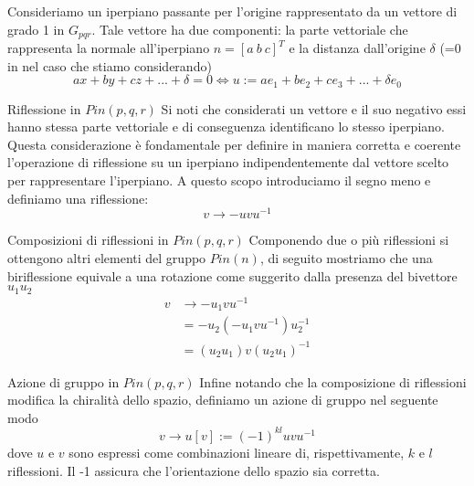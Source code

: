 \begin{frame}
    Consideriamo un iperpiano passante per l’origine rappresentato da un vettore di grado 1 in \(G_{pqr}\). 
   Tale vettore ha due componenti: la parte vettoriale che rappresenta la normale all’iperpiano \(n=[a\ b\ c]^{T}\) e la distanza dall’origine \(\delta\) (=0 in nel caso che stiamo considerando)
   \[
      ax+by+cz+...+\delta =0 \iff u:= ae_1+be_2+ce_3+...+\delta e_0
   \]
\end{frame}

\begin{frame}{Riflessione in \(Pin(p,q,r)\)}
   Si noti che considerati un vettore e il suo negativo essi hanno stessa parte vettoriale e di conseguenza identificano lo stesso iperpiano. 
   Questa considerazione è fondamentale per definire in maniera corretta e coerente l’operazione di riflessione su un iperpiano indipendentemente dal vettore scelto per rappresentare l’iperpiano.
   A questo scopo introduciamo il segno meno e definiamo una riflessione:
   \begin{equation}
      v\to -uvu^{-1}
   \end{equation}
\end{frame}

\begin{frame}{Composizioni di riflessioni in \(Pin(p,q,r)\)}
   Componendo due o più riflessioni si ottengono altri elementi del gruppo \(Pin(n)\), di seguito mostriamo che una biriflessione equivale a una rotazione come suggerito dalla presenza del bivettore \(u_{1}u_{2}\)
   \[
   \begin{aligned}
      v &\to -u_1vu^{-1}\\
      &=-u_2(-u_1vu^{-1})u_2^{-1}\\
      &=(u_2u_1)v(u_2u_1)^{-1}
   \end{aligned}
   \]
\end{frame}

\begin{frame}{Azione di gruppo in \(Pin(p,q,r)\)}
   Infine notando che la composizione di riflessioni modifica la chiralità  dello spazio, definiamo un azione di gruppo nel seguente modo
   \begin{equation}
      v \to u[v]:=(-1)^{kl}uvu^{-1}
   \end{equation}
   dove \(u\) e \(v\) sono espressi come combinazioni lineare di, rispettivamente, \(k\) e \(l\) riflessioni. Il -1 assicura che l’orientazione dello spazio sia corretta.
   
\end{frame}

